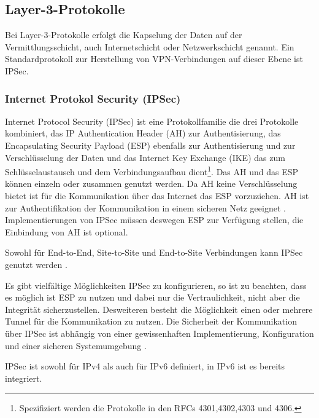 \subsection{Layer-3-Protokolle}
Bei Layer-3-Protokolle erfolgt die Kapselung der Daten auf der Vermittlungsschicht, auch Internetschicht oder Netzwerkschicht genannt. Ein Standardprotokoll zur Herstellung von VPN-Verbindungen auf dieser Ebene ist IPSec.
\subsubsection{Internet Protokol Security (IPSec)}
\label{subsub:L3}
Internet Protocol Security (IPSec) ist eine Protokollfamilie die drei Protokolle kombiniert, das IP Authentication Header (AH) zur Authentisierung, das Encapsulating Security Payload (ESP) ebenfalls zur Authentisierung und zur Verschlüsselung der Daten und das Internet Key Exchange (IKE) das zum Schlüsselaustausch und dem Verbindungsaufbau dient\footnote{Spezifiziert werden die Protokolle in den RFCs 4301,4302,4303 und 4306.}. Das AH und das ESP können einzeln oder zusammen genutzt werden. Da AH keine Verschlüsselung bietet ist für die Kommunikation über das Internet das ESP vorzuziehen. AH ist zur Authentifikation der Kommunikation in einem sicheren Netz geeignet \cite{isi-vpn}. Implementierungen von IPSec müssen deswegen ESP zur Verfügung stellen, die Einbindung von AH ist optional.

Sowohl für End-to-End, Site-to-Site und End-to-Site Verbindungen kann IPSec genutzt werden \cite{rfc4301}.

 Es gibt vielfältige Möglichkeiten IPSec zu konfigurieren, so ist zu beachten, dass es möglich ist ESP zu nutzen und dabei nur die Vertraulichkeit, nicht aber die Integrität sicherzustellen. Desweiteren besteht die Möglichkeit einen oder mehrere Tunnel für die Kommunikation zu nutzen. Die Sicherheit der Kommunikation  über IPSec ist abhängig von einer gewissenhaften Implementierung, Konfiguration und einer sicheren Systemumgebung \cite{rfc4301}. 
  
  IPSec ist sowohl für IPv4 als auch für IPv6 definiert, in IPv6 ist es bereits integriert.
\\

